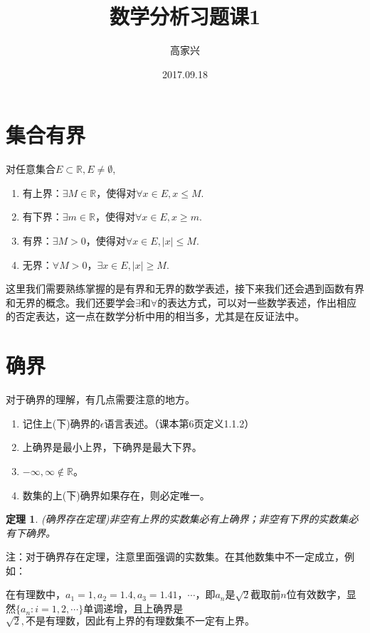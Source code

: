 \documentclass{ctexart}
\title{数学分析习题课1}
\author{高家兴}
\date{2017.09.18}
\newtheorem{theorem}{定理}
\begin{document}
\maketitle

\section{集合有界}
对任意集合$E\subset \mathbb{R}, E \neq \emptyset$,

\begin{enumerate}[(1)]
	\item 有上界：$\exists M\in\mathbb{R}$，使得对$\forall x\in E, x\leq M.$
	\item 有下界：$\exists m\in\mathbb{R}$，使得对$\forall x\in E, x\geq m.$
	\item 有界：$\exists M>0$，使得对$\forall x\in E, |x|\leq M.$
	\item 无界：$\forall M>0$，$\exists x\in E, |x|\ge M.$
\end{enumerate}

这里我们需要熟练掌握的是有界和无界的数学表述，接下来我们还会遇到函数有界和无界的概念。我们还要学会$\exists$和$\forall$的表达方式，可以对一些数学表述，作出相应的否定表达，这一点在数学分析中用的相当多，尤其是在反证法中。

\section{确界}
对于确界的理解，有几点需要注意的地方。
\begin{enumerate}[(1)]
	\item 记住上(下)确界的$\epsilon$语言表述。（课本第6页定义1.1.2）
	\item 上确界是最小上界，下确界是最大下界。
	\item $-\infty,\infty \notin \mathbb{R}$。
	\item 数集的上(下)确界如果存在，则必定唯一。
\end{enumerate}

\begin{theorem}
(确界存在定理)非空有上界的实数集必有上确界；非空有下界的实数集必有下确界。
\end{theorem}

注：对于确界存在定理，注意里面强调的实数集。在其他数集中不一定成立，例如：

在有理数中，$a_1 = 1, a_2 = 1.4, a_3 = 1.41，\cdots$，即$a_n$是$\sqrt{2}$截取前$n$位有效数字，显然$\{a_n:i = 1,2,\cdots\}$单调递增，且上确界是$\sqrt{2},不是有理数，因此有上界的有理数集不一定有上界。$
\end{document}
